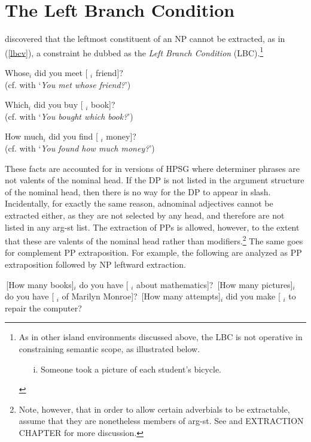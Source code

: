 \documentclass[output=paper]{langsci/langscibook}
\begin{document}

\section{The Left Branch Condition}

\citet{Ross67} discovered that the leftmost constituent of an NP cannot be extracted, 
as in  (\ref{lbcv}), a constraint he dubbed as the {\it Left Branch Condition} (LBC).\footnote{As in other island environments discussed above, the LBC is not operative in constraining semantic scope, as illustrated below.

\begin{itemize}
\item[i.] Someone took a picture of each student's bicycle.\\
\citep[303]{mrs}
\end{itemize}}
 
 
\ea
\ea  \bad{*}Whose$_i$ did you meet [ \spc$_i$ friend]?\\
 (cf. with `{\it You met whose friend?}')
 
\ex \bad{*}Which$_i$ did you buy [ \spc$_i$ book]?\\
(cf. with `{\it You bought which book?}')

\ex \bad{*}How much$_i$ did you find [ \spc$_i$ money]?\\
(cf. with `{\it You found how much money?}')
\z \label{lbcv}
\z

These facts are accounted for in versions of HPSG where determiner phrases
are not valents of the nominal head. If the DP is not listed in the argument structure
of the nominal head, then there is no way for the DP to appear in {\sc slash}.
Incidentally, for exactly the same reason, adnominal adjectives cannot be extracted either, as they are not selected  by any head, and therefore  are not listed in any {\sc arg-st} list. 
The extraction of PPs is allowed, however, to the extent that these are valents of the nominal head rather than modifiers.\footnote{Note, however, that in order to allow certain adverbials to be extractable,  \citet{ginzsag} assume that they are nonetheless members of {\sc arg-st}. See \citet{levhubook} and  EXTRACTION CHAPTER for more discussion.}
The same goes for complement PP extraposition. For example, the following are analyzed as PP extraposition followed by NP leftward extraction.

\ea
 \ea \,[How many books]$_i$ do you have [ \spc$_i$ about mathematics]?
\ex \,[How many pictures]$_i$ do you have [ \spc$_i$ of Marilyn Monroe]?
\ex \,[How many attempts]$_i$ did you make [ \spc$_i$ to repair the computer?
\z
\z
\end{document}
